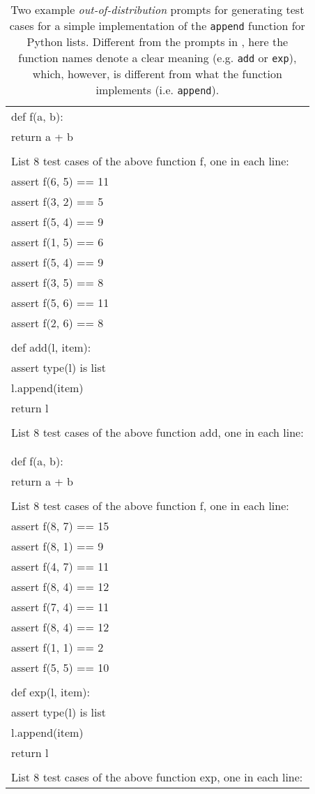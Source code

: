 \begin{table}[!h]
\centering
\small
\begin{tabular}{l}
\toprule
def f(a, b): \\
\quad \quad   return a + b \\
 \\
List 8 test cases of the above function f, one in each line: \\
assert f(6, 5) == 11 \\
assert f(3, 2) == 5 \\
assert f(5, 4) == 9 \\
assert f(1, 5) == 6 \\
assert f(5, 4) == 9 \\
assert f(3, 5) == 8 \\
assert f(5, 6) == 11 \\
assert f(2, 6) == 8 \\
 \\
def add(l, item): \\
\quad \quad   assert type(l) is list \\
\quad \quad   l.append(item) \\
\quad \quad   return l \\
 \\
List 8 test cases of the above function add, one in each line: \\
\\
\bottomrule
\\
def f(a, b): \\
\quad \quad   return a + b \\
 \\
List 8 test cases of the above function f, one in each line: \\
assert f(8, 7) == 15 \\
assert f(8, 1) == 9 \\
assert f(4, 7) == 11 \\
assert f(8, 4) == 12 \\
assert f(7, 4) == 11 \\
assert f(8, 4) == 12 \\
assert f(1, 1) == 2 \\
assert f(5, 5) == 10 \\
 \\
def exp(l, item): \\
\quad \quad   assert type(l) is list \\
\quad \quad   l.append(item) \\
\quad \quad   return l \\
 \\
List 8 test cases of the above function exp, one in each line: \\
\bottomrule
\end{tabular} 
\caption{
Two example \emph{out-of-distribution} prompts for generating test cases for a simple implementation of the \texttt{append} function for Python lists.
Different from the prompts in ,
here the function names denote a clear meaning
(e.g. \texttt{add} or \texttt{exp}), 
which, however, is different from what the function implements
(i.e. \texttt{append}).
}
\label{table:prompt_example_ood}
\end{table}


